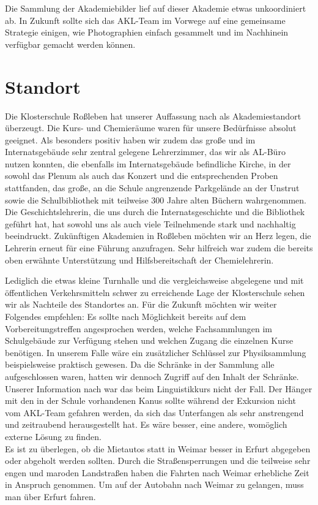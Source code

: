 \documentclass{scrartcl}
\begin{document}
Die Sammlung der Akademiebilder lief auf dieser Akademie etwas
unkoordiniert ab. In Zukunft sollte sich das AKL-Team im Vorwege auf eine
gemeinsame Strategie einigen, wie Photographien einfach gesammelt und
im Nachhinein verf{\"u}gbar
gemacht werden können.\bigskip

\section*{Standort}

Die Klosterschule Ro{\ss}leben hat unserer Auffassung nach als Akademiestandort {\"u}berzeugt. Die Kurs- und Chemier{\"a}ume waren f{\"u}r unsere Bed{\"u}rfnisse absolut geeignet. Als besonders positiv haben wir zudem das gro{\ss}e und im Internatsgeb{\"a}ude sehr zentral gelegene Lehrerzimmer, das wir als AL-B{\"u}ro nutzen konnten, die ebenfalls im Internatsgeb{\"a}ude befindliche Kirche, in der sowohl das Plenum als auch das Konzert und die entsprechenden Proben stattfanden, das gro{\ss}e, an die Schule angrenzende Parkgel{\"a}nde an der Unstrut sowie die Schulbibliothek mit teilweise 300 Jahre alten B{\"u}chern wahrgenommen. Die Geschichtslehrerin, die uns durch die Internatsgeschichte und die Bibliothek gef{\"u}hrt hat, hat sowohl uns als auch viele Teilnehmende stark und nachhaltig beeindruckt. Zuk{\"u}nftigen Akademien in Ro{\ss}leben m{\"o}chten wir an Herz legen, die Lehrerin erneut f{\"u}r eine F{\"u}hrung anzufragen. Sehr hilfreich war zudem die bereits oben erw{\"a}hnte Unterst{\"u}tzung und Hilfsbereitschaft der Chemielehrerin.\medskip

Lediglich die etwas kleine Turnhalle und die vergleichsweise abgelegene und
mit {\"o}ffentlichen Verkehrsmitteln schwer zu erreichende Lage der
Klosterschule sehen wir als Nachteile des Standortes an. F{\"u}r die Zukunft
m{\"o}chten wir weiter Folgendes empfehlen: Es sollte nach M{\"o}glichkeit
bereits auf dem Vorbereitungstreffen angesprochen werden, welche Fachsammlungen
im Schulgeb{\"a}ude zur Verf{\"u}gung stehen und welchen Zugang die einzelnen
Kurse ben{\"o}tigen. In unserem Falle w{\"a}re ein zus{\"a}tzlicher
Schl{\"u}ssel zur Physiksammlung beispielsweise praktisch gewesen. Da die
Schr{\"a}nke in der Sammlung alle aufgeschlossen waren, hatten wir dennoch
Zugriff auf den Inhalt der Schr{\"a}nke. Unserer Information nach war das beim
Linguistikkurs nicht der Fall.
Der H{\"a}nger mit den in der Schule vorhandenen Kanus sollte w{\"a}hrend
der Exkursion nicht vom AKL-Team gefahren werden, da sich das Unterfangen als
sehr anstrengend und zeitraubend herausgestellt hat.
Es w{\"a}re besser, eine andere,
wom{\"o}glich externe L{\"o}sung zu finden.\\
Es ist zu überlegen, ob die Mietautos statt in
Weimar besser in Erfurt abgegeben oder abgeholt werden sollten. Durch die
Stra{\ss}ensperrungen und die teilweise sehr engen und maroden
Landstra{\ss}en haben die Fahrten nach Weimar erhebliche Zeit in Anspruch
genommen. Um auf der Autobahn nach Weimar zu gelangen, muss man {\"u}ber
Erfurt fahren.\bigskip
\end{document}
